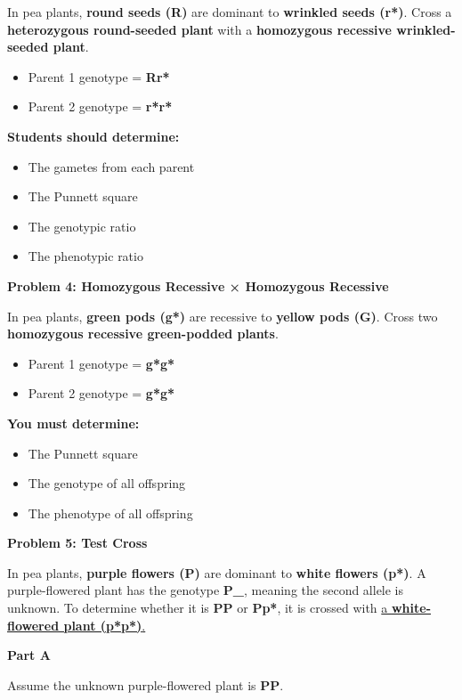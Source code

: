 \documentclass[
  letterpaper,
  DIV=11,
  numbers=noendperiod]{scrreprt}
\begin{document}
In pea plants, \textbf{round seeds (R)} are dominant to \textbf{wrinkled
seeds (r*)}. Cross a \textbf{heterozygous round-seeded plant} with a
\textbf{homozygous recessive wrinkled-seeded plant}.

\begin{itemize}
\item
  Parent 1 genotype = \textbf{Rr*}
\item
  Parent 2 genotype = \textbf{r*r*}
\end{itemize}

\textbf{Students should determine:}

\begin{itemize}
\item
  The gametes from each parent
\item
  The Punnett square
\item
  The genotypic ratio
\item
  The phenotypic ratio
\end{itemize}

\textbf{Problem 4: Homozygous Recessive × Homozygous Recessive}

In pea plants, \textbf{green pods (g*)} are recessive to \textbf{yellow
pods (G)}. Cross two \textbf{homozygous recessive green-podded plants}.

\begin{itemize}
\item
  Parent 1 genotype = \textbf{g*g*}
\item
  Parent 2 genotype = \textbf{g*g*}
\end{itemize}

\textbf{You must determine:}

\begin{itemize}
\item
  The Punnett square
\item
  The genotype of all offspring
\item
  The phenotype of all offspring
\end{itemize}

\textbf{Problem 5: Test Cross}

In pea plants, \textbf{purple flowers (P)} are dominant to \textbf{white
flowers (p*)}. A purple-flowered plant has the genotype \textbf{P\_},
meaning the second allele is unknown. To determine whether it is
\textbf{PP} or \textbf{Pp*}, it is crossed with \ul{a
\textbf{white-flowered plant (p*p*)}.}

\textbf{Part A}

Assume the unknown purple-flowered plant is \textbf{PP}.
\end{document}
